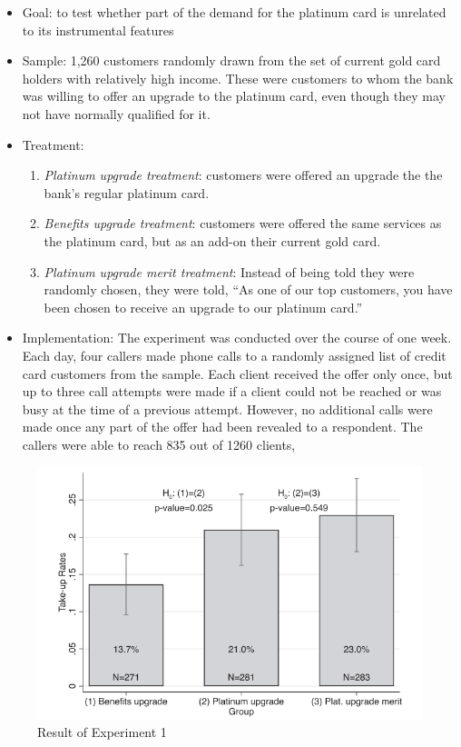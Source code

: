 \documentclass[../root]{subfiles}
\begin{document}
    \begin{itemize}
        \item Goal: to test whether part of the demand for the platinum card is unrelated to its instrumental features
        \item Sample: 1,260 customers randomly drawn from the set of current gold card holders with relatively high income. These were customers to whom the bank was willing to offer an upgrade to the platinum card, even though they may not have normally qualified for it.
        \item Treatment:
        \begin{enumerate}
            \item \textit{Platinum upgrade treatment}: customers were offered an upgrade the the bank's regular platinum card.
            \item \textit{Benefits upgrade treatment}: customers were offered the same services as the platinum card, but as an add-on their current gold card.
            \item \textit{Platinum upgrade merit treatment}: Instead of being told they were randomly chosen, they were told, ``As one of our top customers, you have been chosen to receive an upgrade to our platinum card.''
        \end{enumerate}
        \item Implementation: The experiment was conducted over the course of one week. Each day, four callers made phone calls to a randomly assigned list of credit card customers from the sample. Each client received the offer only once, but up to three call attempts were made if a client could not be reached or was busy at the time of a previous attempt. However, no additional calls were made once any part of the offer had been revealed to a respondent. The callers were able to reach 835 out of 1260 clients, 
    \end{itemize}

    \begin{figure}[h]
        \centering
        \includegraphics[width = 0.8\linewidth]{0717kato/result_exp1.PNG}
        \caption{Result of Experiment 1}
        \label{result1}
    \end{figure}
\end{document}
